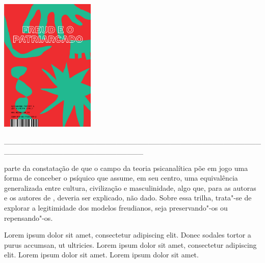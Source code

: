 \pagebreak

\hspace{.5cm}

\begin{center}
\hspace*{-.5cm}\includegraphics[width=45mm]{./imgs/freud.jpg}
\end{center}

\hspace*{-2cm}\_\_\_\_\_\_\_\_\_\_\_\_\_\_\_\_\_\_\_\_\_\_\_\_\_\_\_\_\_\_\_\_\_\_\_\_\_\_\_\_\_\_\_\_\_\_\_\_\_\_\_\_\_\_\_\_\_\_\_\_\_\_\_\_\_\_\_\_\_\_\_\_\_\_

\medskip

 parte da constatação de que o campo da teoria psicanalítica põe em jogo uma forma de conceber o psíquico que assume, em seu centro, uma equivalência generalizada entre cultura, civilização e masculinidade, algo que, para as autoras e os autores de {}, deveria ser explicado, não dado. Sobre essa trilha, trata"-se de explorar a legitimidade dos modelos freudianos, seja preservando"-os ou repensando"-os.

\hspace{.5cm}

\hspace*{-.4cm}\begin{minipage}[c]{0.45\linewidth}
\small{
{}}
\end{minipage}
\begin{minipage}[c]{0.50\linewidth}
\small{Lorem ipsum dolor sit amet, consectetur adipiscing elit.
Donec sodales tortor a purus accumsan, ut ultricies. Lorem ipsum dolor sit amet, consectetur adipiscing elit. Lorem ipsum dolor sit amet. Lorem ipsum dolor sit amet.} 
\end{minipage}

\pagebreak